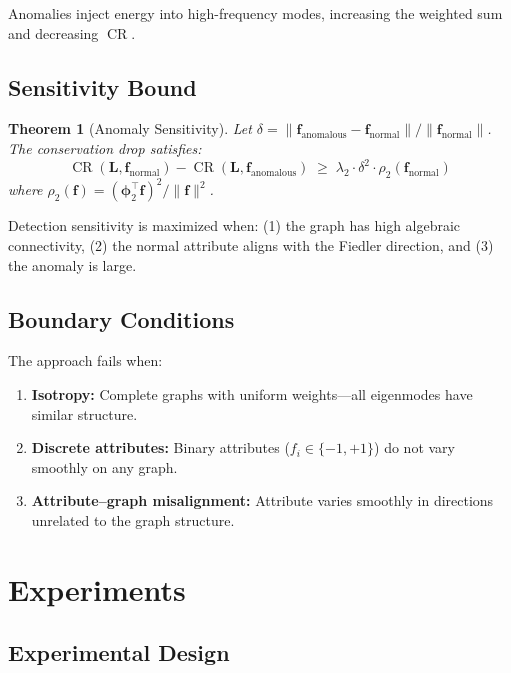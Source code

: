 \documentclass[11pt,a4paper]{article}
\newtheorem{theorem}{Theorem}[section]
\newcommand{\bff}{\mathbf{f}}
\newcommand{\bL}{\mathbf{L}}
\newcommand{\bphi}{\boldsymbol{\phi}}
\DeclareMathOperator{\CR}{CR}
\begin{document}
Anomalies inject energy into high-frequency modes, increasing the weighted sum
and decreasing $\CR$.

\subsection{Sensitivity Bound}

\begin{theorem}[Anomaly Sensitivity]\label{thm:sensitivity}
Let $\delta = \|\bff_{\mathrm{anomalous}} - \bff_{\mathrm{normal}}\| /
\|\bff_{\mathrm{normal}}\|$.  The conservation drop satisfies:
\begin{equation}
  \CR(\bL, \bff_{\mathrm{normal}}) - \CR(\bL, \bff_{\mathrm{anomalous}})
  \;\geq\; \lambda_2 \cdot \delta^2 \cdot \rho_2(\bff_{\mathrm{normal}})
\end{equation}
where $\rho_2(\bff) = (\bphi_2^\top \bff)^2 / \|\bff\|^2$.
\end{theorem}

Detection sensitivity is maximized when: (1) the graph has high algebraic
connectivity, (2) the normal attribute aligns with the Fiedler direction,
and (3) the anomaly is large.

\subsection{Boundary Conditions}

The approach fails when:
\begin{enumerate}
  \item \textbf{Isotropy:} Complete graphs with uniform weights---all eigenmodes
        have similar structure.
  \item \textbf{Discrete attributes:} Binary attributes ($f_i \in \{-1, +1\}$)
        do not vary smoothly on any graph.
  \item \textbf{Attribute--graph misalignment:} Attribute varies smoothly in
        directions unrelated to the graph structure.
\end{enumerate}

\section{Experiments}
\label{sec:experiments}

\subsection{Experimental Design}
\end{document}
